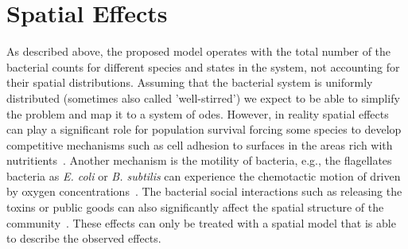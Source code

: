 \documentclass[10pt,A4paper]{article}
\numberwithin{equation}{section}
\begin{document}
\section{Spatial Effects}
As described above, the proposed model operates with the total number of the bacterial counts for
different species and states in the system, not accounting for their spatial distributions.
Assuming that the bacterial system is uniformly distributed (sometimes also called 'well-stirred')
we expect to be able to simplify the problem and map it to a system of \acp{ode}.
However, in reality spatial effects can play a significant role for population survival forcing some
species to develop competitive mechanisms such as cell adhesion to surfaces in the areas rich with
nutritients~\cite{htuson_bacteriasurface_2013}.
Another mechanism is the motility of bacteria, e.g., the flagellates bacteria as \textit{E. coli} or
\textit{B. subtilis} can experience the chemotactic motion of driven by oxygen
concentrations~\cite{decoene_microscopic_2011}.
The bacterial social interactions such as releasing the toxins or public goods can also
significantly affect the spatial structure of the community~\cite{blanchard_bacterial_2015}.
These effects can only be treated with a spatial model that is able to describe the observed
effects.\\
%
%
%
%
\end{document}
